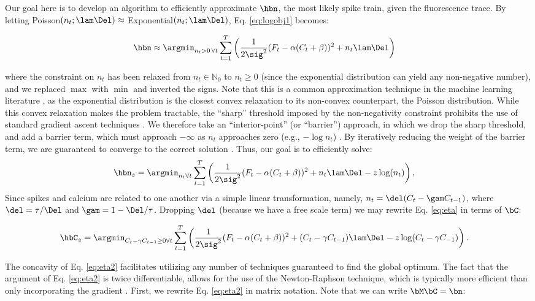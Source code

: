 Our goal here is to develop an algorithm to efficiently approximate $\hbn$, the most likely spike train, given the fluorescence trace. By letting Poisson$(n_t; \lam\Del) \approx$ Exponential$(n_t; \lam\Del)$, Eq. \eqref{eq:logobj1} becomes:

\begin{align} \label{eq:obj2}
\hbn &\approx \argmin_{n_t>0 \, \forall t}  \sum_{t=1}^T \bigg( \frac{1}{2 \sig^2}(F_t - \alpha(C_t + \beta))^2  + n_t \lam \Del \bigg) 
\end{align}

\noindent where the constraint on $n_t$ has been relaxed from  $n_t \in \mathbb{N}_0$ to $n_t \geq 0$ (since the exponential distribution can yield any non-negative number), and we replaced $\max$ with $\min$ and inverted the signs.  Note that this is a common approximation technique in the machine learning literature \cite{TBF01}, as the exponential distribution is the closest convex relaxation to its non-convex counterpart, the Poisson distribution. While this convex relaxation makes the problem tractable, the ``sharp'' threshold imposed by the non-negativity constraint prohibits the use of standard gradient ascent techniques \cite{CONV04}. We therefore take an ``interior-point'' (or ``barrier'') approach, in which we drop the sharp threshold, and add a barrier term, which must approach $-\infty$ as $n_t$ approaches zero (e.g., $-\log n_t$) \cite{CONV04}.  By iteratively reducing the weight of the barrier term, we are guaranteed to converge to the correct solution \cite{CONV04}.  Thus, our goal is to efficiently solve:
\begin{align} \label{eq:eta}
\hbn_{\zzz} &= \argmin_{n_t \forall t}  \sum_{t=1}^T \left( \frac{1}{2 \sig^2}(F_t - \alpha(C_t + \beta))^2  +  n_t  \lam \Del - \zzz \log(n_t) \right),
\end{align}
Since spikes and calcium are related to one another via a simple linear transformation, namely, $n_t= \del (C_t-\gam C_{t-1})$, where $\del=\tau/\Del$ and $\gam=1-\Del/\tau$.  Dropping $\del$ (because we have a free scale term) we may rewrite Eq. \eqref{eq:eta} in terms of $\bC$:

\begin{align} 
\hbC_{\zzz} &= \argmin_{C_t - \gamma C_{t-1} \geq 0 \forall t} \sum_{t=1}^{T} \left( \frac{1}{2 \sig^2} (F_t -\alpha (C_t + \beta))^2  + (C_t - \gamma C_{t-1}) \lam \Del - \zzz \log(C_t - \gamma C_{-1}) \right). \label{eq:eta2}
\end{align}

\noindent The concavity of Eq. \eqref{eq:eta2} facilitates utilizing any number of techniques guaranteed to find the global optimum.  The fact that the argument of Eq. \eqref{eq:eta2} is twice differentiable, allows for the use of the Newton-Raphson technique, which is typically more efficient than only incorporating the gradient \cite{CONV04}. First, we rewrite Eq. \eqref{eq:eta2} in matrix notation.  Note that we can write $\bM \bC = \bn$:

